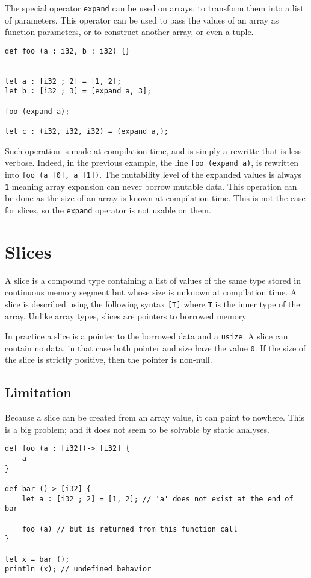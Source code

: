 The special operator \texttt{expand} can be used on arrays, to transform them
into a list of parameters. This operator can be used to pass the values of an
array as function parameters, or to construct another array, or even a tuple.

\begin{lstlisting}[style=coloredverbatim]
def foo (a : i32, b : i32) {}


let a : [i32 ; 2] = [1, 2];
let b : [i32 ; 3] = [expand a, 3];

foo (expand a);

let c : (i32, i32, i32) = (expand a,);
\end{lstlisting}

Such operation is made at compilation time, and is simply a rewritte that is
less verbose. Indeed, in the previous example, the line \texttt{foo (expand a)},
is rewritten into \texttt{foo (a [0], a [1])}. The mutability level of the
expanded values is always \texttt{1} meaning array expansion can never borrow
mutable data. This operation can be done as the size of an array is known at
compilation time. This is not the case for slices, so the \texttt{expand}
operator is not usable on them.

\section{Slices}
\label{sec:slices}

A slice is a compound type containing a list of values of the same type stored
in continuous memory segment but whose size is unknown at compilation time. A
slice is described using the following syntax \texttt{[T]} where \texttt{T} is
the inner type of the array. Unlike array types, slices are pointers to borrowed
memory.

In practice a slice is a pointer to the borrowed data and a \texttt{usize}. A
slice can contain no data, in that case both pointer and size have the value
\texttt{0}. If the size of the slice is strictly positive, then the pointer is
non-null.

\subsection {Limitation}

Because a slice can be created from an array value, it can point to nowhere.
This is a big problem; and it does not seem to be solvable by static analyses.

\begin{lstlisting}[style=coloredverbatim]
def foo (a : [i32])-> [i32] {
    a
}

def bar ()-> [i32] {
    let a : [i32 ; 2] = [1, 2]; // 'a' does not exist at the end of bar

    foo (a) // but is returned from this function call
}

let x = bar ();
println (x); // undefined behavior
\end{lstlisting}

